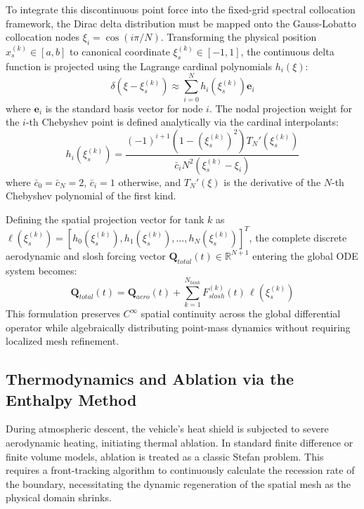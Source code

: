 \documentclass[11pt,a4paper]{article}
\theoremstyle{definition}
\numberwithin{equation}{section}
\begin{document}
To integrate this discontinuous point force into the fixed-grid spectral collocation framework, the Dirac delta distribution must be mapped onto the Gauss-Lobatto collocation nodes $\xi_i = \cos(i\pi / N)$. Transforming the physical position $x_s^{(k)} \in [a, b]$ to canonical coordinate $\xi_s^{(k)} \in [-1, 1]$, the continuous delta function is projected using the Lagrange cardinal polynomials $h_i(\xi)$:
\begin{equation}
    \delta\left(\xi - \xi_s^{(k)}\right) \approx \sum_{i=0}^N h_i\left(\xi_s^{(k)}\right) \mathbf{e}_i
\end{equation}
where $\mathbf{e}_i$ is the standard basis vector for node $i$. The nodal projection weight for the $i$-th Chebyshev point is defined analytically via the cardinal interpolants:
\begin{equation}
    h_i\left(\xi_s^{(k)}\right) = \frac{(-1)^{i+1} \left(1 - \left(\xi_s^{(k)}\right)^2\right) T_N'\left(\xi_s^{(k)}\right)}{\bar{c}_i N^2 \left(\xi_s^{(k)} - \xi_i\right)}
\end{equation}
where $\bar{c}_0 = \bar{c}_N = 2$, $\bar{c}_i = 1$ otherwise, and $T_N'(\xi)$ is the derivative of the $N$-th Chebyshev polynomial of the first kind.

Defining the spatial projection vector for tank $k$ as $\boldsymbol{\ell}\left(\xi_s^{(k)}\right) = \left[ h_0\left(\xi_s^{(k)}\right), h_1\left(\xi_s^{(k)}\right), \dots, h_N\left(\xi_s^{(k)}\right) \right]^T$, the complete discrete aerodynamic and slosh forcing vector $\mathbf{Q}_{total}(t) \in \mathbb{R}^{N+1}$ entering the global ODE system becomes:
\begin{equation}
    \mathbf{Q}_{total}(t) = \mathbf{Q}_{aero}(t) + \sum_{k=1}^{N_{tank}} F_{slosh}^{(k)}(t) \, \boldsymbol{\ell}\left(\xi_s^{(k)}\right)
\end{equation}
This formulation preserves $C^\infty$ spatial continuity across the global differential operator while algebraically distributing point-mass dynamics without requiring localized mesh refinement.

\subsection{Thermodynamics and Ablation via the Enthalpy Method}

During atmospheric descent, the vehicle's heat shield is subjected to severe aerodynamic heating, initiating thermal ablation. In standard finite difference or finite volume models, ablation is treated as a classic Stefan problem. This requires a front-tracking algorithm to continuously calculate the recession rate of the boundary, necessitating the dynamic regeneration of the spatial mesh as the physical domain shrinks.
\end{document}
